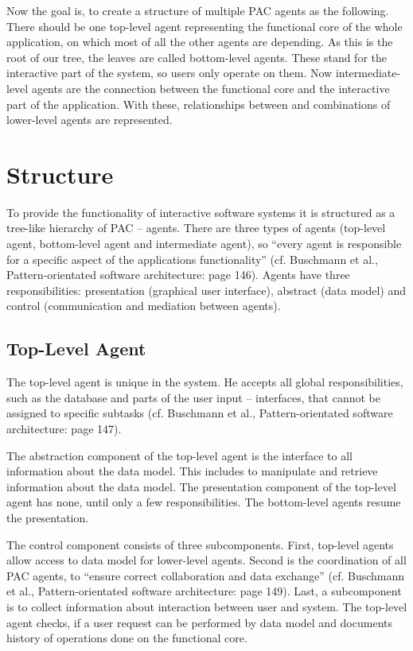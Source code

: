 \documentclass{scrbook}
\begin{document}
Now the goal is, to create a structure of multiple PAC agents as the following. There should be one
top-level agent representing the functional core of the whole application, on which most of all the
other agents are depending. As this is the root of our tree, the leaves are called bottom-level agents.
These stand for the interactive part of the system, so users only operate on them. Now intermediate-
level agents are the connection between the functional core and the interactive part of the
application. With these, relationships between and combinations of lower-level agents are
represented.




\section{Structure}	%

To provide the functionality of interactive software systems it is structured as a tree-like hierarchy of
PAC – agents. There are three types of agents (top-level agent, bottom-level agent and intermediate
agent), so “every agent is responsible for a specific aspect of the applications functionality” (cf.
Buschmann et al., Pattern-orientated software architecture: page 146). Agents have three
responsibilities: presentation (graphical user interface), abstract (data model) and control
(communication and mediation between agents).



\subsection{Top-Level Agent}	%

The top-level agent is unique in the system. He accepts all global responsibilities, such as the
database and parts of the user input – interfaces, that cannot be assigned to specific subtasks (cf.
Buschmann et al., Pattern-orientated software architecture: page 147).

The abstraction component of the top-level agent is the interface to all information about the data
model. This includes to manipulate and retrieve information about the data model.
The presentation component of the top-level agent has none, until only a few responsibilities. The
bottom-level agents resume the presentation.

The control component consists of three subcomponents. First, top-level agents allow access to data
model for lower-level agents. Second is the coordination of all PAC agents, to “ensure correct
collaboration and data exchange” (cf. Buschmann et al., Pattern-orientated software architecture:
page 149). Last, a subcomponent is to collect information about interaction between user and
system. The top-level agent checks, if a user request can be performed by data model and
documents history of operations done on the functional core.
\end{document}

